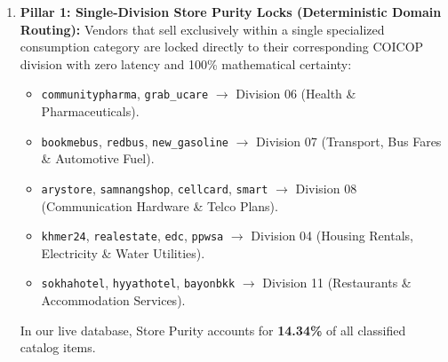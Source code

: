 \documentclass[11pt,a4paper,oneside]{article}
\begin{document}
\begin{enumerate}
    \item \textbf{Pillar 1: Single-Division Store Purity Locks (Deterministic Domain Routing):}
    Vendors that sell exclusively within a single specialized consumption category are locked directly to their corresponding COICOP division with zero latency and 100\% mathematical certainty:
    \begin{itemize}[noitemsep]
        \item \texttt{communitypharma}, \texttt{grab\_ucare} $\rightarrow$ Division 06 (Health \& Pharmaceuticals).
        \item \texttt{bookmebus}, \texttt{redbus}, \texttt{new\_gasoline} $\rightarrow$ Division 07 (Transport, Bus Fares \& Automotive Fuel).
        \item \texttt{arystore}, \texttt{samnangshop}, \texttt{cellcard}, \texttt{smart} $\rightarrow$ Division 08 (Communication Hardware \& Telco Plans).
        \item \texttt{khmer24}, \texttt{realestate}, \texttt{edc}, \texttt{ppwsa} $\rightarrow$ Division 04 (Housing Rentals, Electricity \& Water Utilities).
        \item \texttt{sokhahotel}, \texttt{hyyathotel}, \texttt{bayonbkk} $\rightarrow$ Division 11 (Restaurants \& Accommodation Services).
    \end{itemize}
    In our live database, Store Purity accounts for \textbf{14.34\%} of all classified catalog items.


\end{enumerate}
\end{document}
